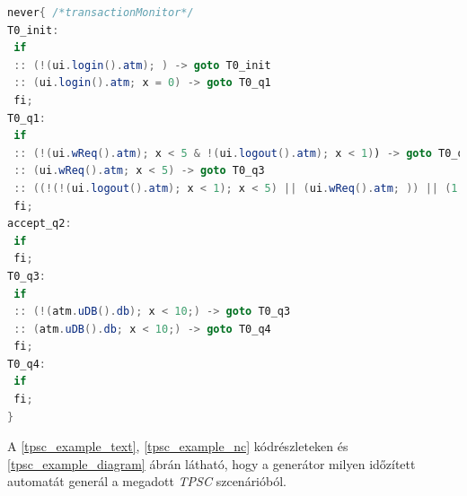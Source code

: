 \begin{lstlisting}[language=java,frame=single, float=h!, caption={Generált időzített automata \textit{never claim} formátumban.},captionpos=b,label=tpsc_example_nc]
never{ /*transactionMonitor*/
T0_init:
 if
 :: (!(ui.login().atm); ) -> goto T0_init
 :: (ui.login().atm; x = 0) -> goto T0_q1
 fi;
T0_q1:
 if
 :: (!(ui.wReq().atm); x < 5 & !(ui.logout().atm); x < 1)) -> goto T0_q1
 :: (ui.wReq().atm; x < 5) -> goto T0_q3
 :: ((!(!(ui.logout().atm); x < 1); x < 5) || (ui.wReq().atm; )) || (1, x >= 5))) -> goto accept_q2
 fi;
accept_q2:
 if
 fi;
T0_q3:
 if
 :: (!(atm.uDB().db); x < 10;) -> goto T0_q3
 :: (atm.uDB().db; x < 10;) -> goto T0_q4
 fi;
T0_q4:
 if
 fi;
}
\end{lstlisting}

A \ref{tpsc_example_text}, \ref{tpsc_example_nc} kódrészleteken és \ref{tpsc_example_diagram} ábrán látható, hogy a generátor milyen időzített automatát generál a megadott \textit{TPSC} szcenárióból.